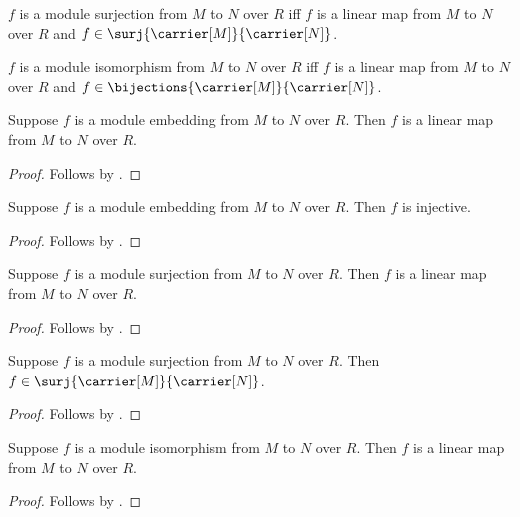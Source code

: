 \begin{definition}\label{module_surjection}
    $f$ is a module surjection from $M$ to $N$ over $R$ iff
        $f$ is a linear map from $M$ to $N$ over $R$ and
        $f\in\surj{\carrier[M]}{\carrier[N]}$.
\end{definition}

\begin{definition}\label{module_isomorphism}
    $f$ is a module isomorphism from $M$ to $N$ over $R$ iff
        $f$ is a linear map from $M$ to $N$ over $R$ and
        $f\in\bijections{\carrier[M]}{\carrier[N]}$.
\end{definition}

\begin{proposition}\label{module_embedding_is_linear_map}
    Suppose $f$ is a module embedding from $M$ to $N$ over $R$.
    Then $f$ is a linear map from $M$ to $N$ over $R$.
\end{proposition}
\begin{proof}
    Follows by .
\end{proof}

\begin{proposition}\label{module_embedding_injective}
    Suppose $f$ is a module embedding from $M$ to $N$ over $R$.
    Then $f$ is injective.
\end{proposition}
\begin{proof}
    Follows by .
\end{proof}

\begin{proposition}\label{module_surjection_is_linear_map}
    Suppose $f$ is a module surjection from $M$ to $N$ over $R$.
    Then $f$ is a linear map from $M$ to $N$ over $R$.
\end{proposition}
\begin{proof}
    Follows by .
\end{proof}

\begin{proposition}\label{module_surjection_is_surj}
    Suppose $f$ is a module surjection from $M$ to $N$ over $R$.
    Then $f\in\surj{\carrier[M]}{\carrier[N]}$.
\end{proposition}
\begin{proof}
    Follows by .
\end{proof}

\begin{proposition}\label{module_isomorphism_is_linear_map}
    Suppose $f$ is a module isomorphism from $M$ to $N$ over $R$.
    Then $f$ is a linear map from $M$ to $N$ over $R$.
\end{proposition}
\begin{proof}
    Follows by .
\end{proof}

